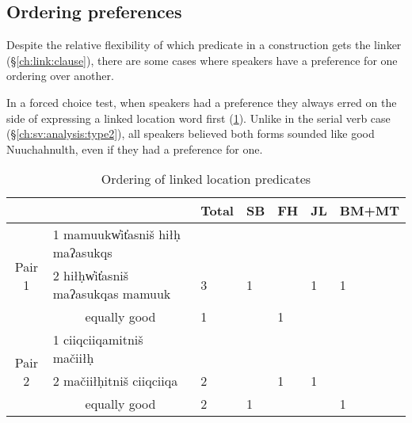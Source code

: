 \subsection{Ordering preferences} \label{ch:link:preferences}

Despite the relative flexibility of which predicate in a construction gets the linker (\S\ref{ch:link:clause}), there are some cases where speakers have a preference for one ordering over another.

In a forced choice test, when speakers had a preference they always erred on the side of expressing a linked location word first (\cref{table:orderinglinkloc}). Unlike in the serial verb case (\S\ref{ch:sv:analysis:type2}), all speakers believed both forms sounded like good Nuuchahnulth, even if they had a preference for one.

\begin{table}[H]
\centering
\caption{Ordering of linked location predicates}
\label{table:orderinglinkloc}
\begin{tabular}{cllllll}
 &  & Total & SB & FH & JL & BM+MT \\ \hline
\multicolumn{1}{|c|}{\multirow{3}{*}{Pair 1}} & \multicolumn{1}{l|}{1 mamuukw̓it̓asniš hiłḥ maʔasukqs} & \multicolumn{1}{l|}{} & \multicolumn{1}{l|}{} & \multicolumn{1}{l|}{} & \multicolumn{1}{l|}{} & \multicolumn{1}{l|}{} \\ \cline{2-7} 
\multicolumn{1}{|c|}{} & \multicolumn{1}{l|}{2 hiłḥw̓it̓asniš maʔasukqas mamuuk} & \multicolumn{1}{l|}{3} & \multicolumn{1}{l|}{1} & \multicolumn{1}{l|}{} & \multicolumn{1}{l|}{1} & \multicolumn{1}{l|}{1} \\ \cline{2-7} 
\multicolumn{1}{|c|}{} & \multicolumn{1}{c|}{equally good} & \multicolumn{1}{l|}{1} & \multicolumn{1}{l|}{} & \multicolumn{1}{l|}{1} & \multicolumn{1}{l|}{} & \multicolumn{1}{l|}{} \\ \hline \hline
\multicolumn{1}{|c|}{\multirow{3}{*}{Pair 2}} & \multicolumn{1}{l|}{1 ciiqciiqamitniš mačiiłḥ} & \multicolumn{1}{l|}{} & \multicolumn{1}{l|}{} & \multicolumn{1}{l|}{} & \multicolumn{1}{l|}{} & \multicolumn{1}{l|}{} \\ \cline{2-7} 
\multicolumn{1}{|c|}{} & \multicolumn{1}{l|}{2 mačiiłḥitniš ciiqciiqa} & \multicolumn{1}{l|}{2} & \multicolumn{1}{l|}{} & \multicolumn{1}{l|}{1} & \multicolumn{1}{l|}{1} & \multicolumn{1}{l|}{} \\ \cline{2-7} 
\multicolumn{1}{|c|}{} & \multicolumn{1}{c|}{equally good} & \multicolumn{1}{l|}{2} & \multicolumn{1}{l|}{1} & \multicolumn{1}{l|}{} & \multicolumn{1}{l|}{} & \multicolumn{1}{l|}{1} \\ \hline
\end{tabular}
\end{table}

